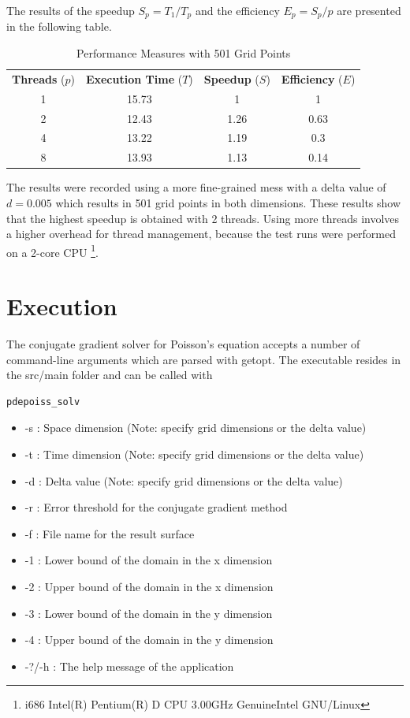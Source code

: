 \documentclass[12pt,a4paper]{report}
\begin{document}
The results of the speedup $S_{p}=T_{1}/T_{p}$ and the efficiency
$E_{p}=S_{p}/p$ are presented in the following table.

\begin{table}[htb]
  \begin{tabular}{c || c c c}
    \textbf{Threads} ($p$) & \textbf{Execution Time} ($T$) & \textbf{Speedup} ($S$) &
    \textbf{Efficiency} ($E$) \\
    1 & 15.73 & 1 & 1 \\
    2 & 12.43 & 1.26 & 0.63 \\
    4 & 13.22 & 1.19 & 0.3\\
    8 & 13.93 & 1.13 & 0.14\\
  \end{tabular}
  \caption{Performance Measures with 501 Grid Points}
  \label{tab:thread-perf}
\end{table}

The results were recorded using a more fine-grained mess with a delta
value of $d=0.005$ which results in 501 grid points in both
dimensions. These results show that the highest speedup is obtained
with 2 threads. Using more threads involves a higher overhead for
thread management, because the test runs were performed on a 2-core
CPU \footnote{i686 Intel(R) Pentium(R) D CPU 3.00GHz GenuineIntel
  GNU/Linux}.

\chapter{Execution}
\label{cha:execution}

The conjugate gradient solver for Poisson's equation accepts a number
of command-line arguments which are parsed with getopt. The executable
resides in the src/main folder and can be
called with \begin{verbatim}pdepoiss_solv\end{verbatim}

\begin{itemize}
\item -s : Space dimension (Note: specify grid dimensions or the delta
  value)
\item -t : Time dimension (Note: specify grid dimensions or the delta
  value)
\item -d : Delta value (Note: specify grid dimensions or the delta
  value)
\item -r : Error threshold for the conjugate gradient method
\item -f : File name for the result surface
\item -1 : Lower bound of the domain in the x dimension
\item -2 : Upper bound of the domain in the x dimension
\item -3 : Lower bound of the domain in the y dimension
\item -4 : Upper bound of the domain in the y dimension
\item -?/-h : The help message of the application
\end{itemize}
\end{document}
